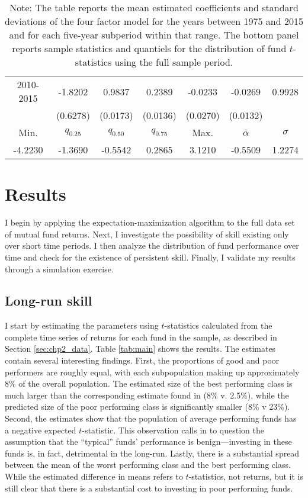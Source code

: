 \begin{table}[ht!]
\begin{tabular}{*{7}{c}}
2010-2015 	& -1.8202 & 0.9837 & 0.2389 & -0.0233 & -0.0269 & 0.9928 \\
        	&  (0.6278) & (0.0173) & (0.0136) &  (0.0270) &  (0.0132) & \\
\midrule
Min. & $q_{0.25}$ & $q_{0.50}$ & $q_{0.75}$ & Max. & $\bar{\alpha}$ & $\sigma$ \\
\midrule
-4.2230 & -1.3690 & -0.5542 & 0.2865 & 3.1210 & -0.5509 & 1.2274 \\
\bottomrule
\end{tabular}
\captionsetup{position=below, font=footnotesize, justification=justified, width=0.67\linewidth}
\caption*{Note: The table reports the mean estimated coefficients and standard deviations of the \citet{Carhart1997} four factor model for the years between 1975 and 2015 and for each five-year subperiod within that range. The bottom panel reports sample statistics and quantiels for the distribution of fund $t$-statistics using the full sample period.}
\label{tab:summary}
\end{table}

\section{Results}
\label{sec:results}

I begin by applying the expectation-maximization algorithm to the full data set of mutual fund returns. Next, I investigate the possibility of skill existing only over short time periods. I then analyze the distribution of fund performance over time and check for the existence of persistent skill. Finally, I validate my results through a simulation exercise.

\subsection{Long-run skill}
I start by estimating the parameters using $t$-statistics calculated from the complete time series of returns for each fund in the sample, as described in Section \ref{sec:chp2_data}. Table \ref{tab:main} shows the results. The estimates contain several interesting findings.  First, the proportions of good and poor performers are roughly equal, with each subpopulation making up approximately 8\% of the overall population.  The estimated size of the best performing class is much larger than the corresponding estimate found in \citet{Barras2010} (8\% v. 2.5\%), while the predicted size of the poor performing class is significantly smaller (8\% v 23\%). Second, the estimates show that the population of average performing funds has a negative expected $t$-statistic.  This observation calls in to question the assumption that the ``typical'' funds' performance is benign---investing in these funds is, in fact, detrimental in the long-run.  Lastly, there is a substantial spread between the mean of the worst performing class and the best performing class. While the estimated difference in means refers to $t$-statistics, not returns, but it is still clear that there is a substantial cost to investing in poor performing funds.

